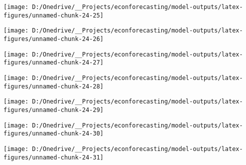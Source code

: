 \documentclass[11pt, letterpaper]{article}\usepackage[]{graphicx}\usepackage[]{color}
\begin{document}
{\centering \texttt{[image: D:/Onedrive/\_\_Projects/econforecasting/model-outputs/latex-figures/unnamed-chunk-24-25]} 

}




{\centering \texttt{[image: D:/Onedrive/\_\_Projects/econforecasting/model-outputs/latex-figures/unnamed-chunk-24-26]} 

}




{\centering \texttt{[image: D:/Onedrive/\_\_Projects/econforecasting/model-outputs/latex-figures/unnamed-chunk-24-27]} 

}




{\centering \texttt{[image: D:/Onedrive/\_\_Projects/econforecasting/model-outputs/latex-figures/unnamed-chunk-24-28]} 

}




{\centering \texttt{[image: D:/Onedrive/\_\_Projects/econforecasting/model-outputs/latex-figures/unnamed-chunk-24-29]} 

}




{\centering \texttt{[image: D:/Onedrive/\_\_Projects/econforecasting/model-outputs/latex-figures/unnamed-chunk-24-30]} 

}




{\centering \texttt{[image: D:/Onedrive/\_\_Projects/econforecasting/model-outputs/latex-figures/unnamed-chunk-24-31]} 

}
\end{document}
